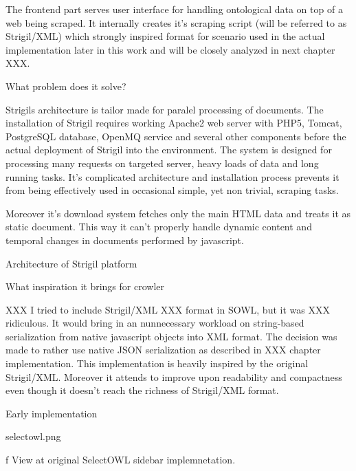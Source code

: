The frontend part serves user interface for handling ontological data on top of
a web being scraped. It internally creates it's scraping script (will be
referred to as Strigil/XML) which strongly inspired format for scenario used in
the actual implementation later in this work and will be closely analyzed in
next chapter XXX. 


\secc What problem does it solve?

Strigils architecture is tailor made for paralel processing of documents.  The
installation of Strigil requires working Apache2 web server with PHP5, Tomcat,
PostgreSQL database, OpenMQ service and several other components before the
actual deployment of Strigil into the environment. The system is designed for
processing many requests on targeted server, heavy loads of data and long
running tasks. It's complicated architecture and installation process prevents
it from being effectively used in occasional simple, yet non trivial, scraping
tasks. 

Moreover it's download system fetches only the main HTML data and treats it as
static document. This way it can't properly handle dynamic content and temporal
changes in documents performed by javascript. 


\secc Architecture of Strigil platform



\secc What inspiration it brings for crowler

XXX I tried to include Strigil/XML XXX format in SOWL, but it was XXX
ridiculous. It would bring in an nunnecessary workload on string-based
serialization from native javascript objects into XML format. The decision was
made to rather use native JSON serialization as described in XXX chapter
implementation. This implementation is heavily inspired by the original
Strigil/XML. Moreover it attends to improve upon readability and compactness
even though it doesn't reach the richness of Strigil/XML format. 

%




\sec Early implementation



\midinsert
\picw=7cm \cinspic selectowl.png
\caption/f View at original SelectOWL sidebar implemnetation. 
\endinsert



